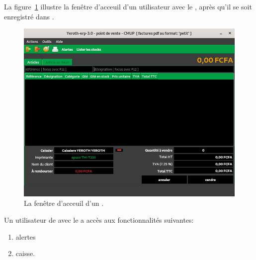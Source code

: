 \label{sec:utilisateurs-lecaissier}

La figure~\ref{fig:fenetre-principale-caissier} illustre la
fen\^etre d'acceuil d'un utilisateur avec le \role \caissier,
apr\`es qu'il se soit enregistr\'e dans \yeren.\\

\begin{figure}[!htbp]
\centering
\includegraphics[scale=0.63]{images/yeren-fenetre-caissier.png}
\caption{La fen\^etre d'acceuil d'un \caissier.}
\label{fig:fenetre-principale-caissier}
\end{figure}

Un utilisateur de \yeren avec le \role \caissier a acc\`es
aux fonctionnalit\'es suivantes:
\begin{enumerate}[1)]
	\item alertes
	\item caisse.\\
\end{enumerate}